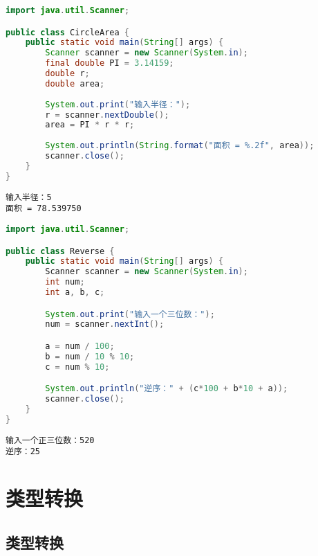
\begin{lstlisting}[language=Java]
import java.util.Scanner;

public class CircleArea {
	public static void main(String[] args) {
		Scanner scanner = new Scanner(System.in);
		final double PI = 3.14159;
		double r;
		double area;
		
		System.out.print("输入半径：");
		r = scanner.nextDouble();
		area = PI * r * r;
		
		System.out.println(String.format("面积 = %.2f", area));
		scanner.close();
	}
}
\end{lstlisting}

\begin{tcolorbox}
	\begin{verbatim}
输入半径：5
面积 = 78.539750
	\end{verbatim}
\end{tcolorbox}

\vspace{0.5cm}


\begin{lstlisting}[language=Java]
import java.util.Scanner;

public class Reverse {
	public static void main(String[] args) {
		Scanner scanner = new Scanner(System.in);
		int num;
		int a, b, c;

		System.out.print("输入一个三位数：");
		num = scanner.nextInt();

		a = num / 100;
		b = num / 10 % 10;
		c = num % 10;

		System.out.println("逆序：" + (c*100 + b*10 + a));
		scanner.close();
	}
}
\end{lstlisting}

\begin{tcolorbox}
	\begin{verbatim}
输入一个正三位数：520
逆序：25
	\end{verbatim}
\end{tcolorbox}

\newpage

\section{类型转换}

\subsection{类型转换}

